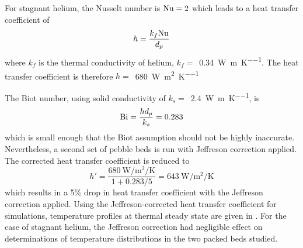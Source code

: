 For stagnant helium, the Nusselt number is $\mathrm{Nu} = 2$ which leads to a heat transfer coefficient of
\begin{equation}
h = \frac{k_f\mathrm{Nu}}{d_p}
\end{equation}
where $k_f$ is the thermal conductivity of helium, $k_f =$~\SI{0.34}{\watt\per\meter\per\kelvin}. The heat transfer coefficient is therefore $h = $~\SI{680}{\watt\per\meter\squared\per\kelvin}

The Biot number, using solid conductivity of $k_s =$~\SI{2.4}{\watt\per\meter\per\kelvin}, is
\begin{equation}
\mathrm{Bi} = \frac{h d_p}{k_s} = 0.283
\end{equation}
which is small enough that the Biot assumption should not be highly inaccurate. Nevertheless, a second set of pebble beds is run with Jeffreson correction applied. The corrected heat transfer coefficient is reduced to
\begin{equation}
h' = \frac{\SI{680}{\watt\per\meter\squared\per\kelvin}}{1 + 0.283/5} = \SI{643}{\watt\per\meter\squared\per\kelvin}
\end{equation}
which results in a 5\% drop in heat transfer coefficient with the Jeffreson correction applied.
Using the Jeffreson-corrected heat transfer coefficient for simulations, temperature profiles at thermal steady state are given in . For the case of stagnant helium, the Jeffreson correction had negligible effect on determinations of temperature distributions in the two packed beds studied. 

